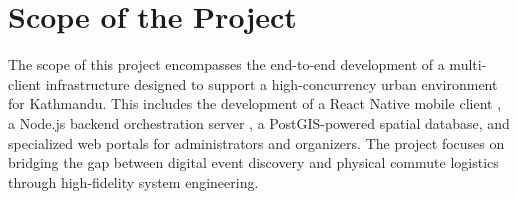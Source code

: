 \section{Scope of the Project}
The scope of this project encompasses the end-to-end development of a multi-client infrastructure designed to support a high-concurrency urban environment for Kathmandu. This includes the development of a React Native mobile client \cite{reactnative}, a Node.js backend orchestration server \cite{nodejs}, a PostGIS-powered spatial database, and specialized web portals for administrators and organizers. The project focuses on bridging the gap between digital event discovery and physical commute logistics through high-fidelity system engineering.

